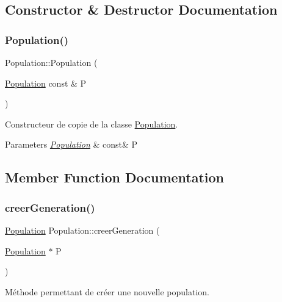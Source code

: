 \subsection{Constructor \& Destructor Documentation}
\mbox{\label{class_population_afb8bfdf1315ba757c6e616e3dcb7c0bb}} 
\subsubsection{\texorpdfstring{Population()}{Population()}}
{\footnotesize\ttfamily Population\+::\+Population (\begin{DoxyParamCaption}\item[{\hyperlink{class_population}{Population} const \&}]{P }\end{DoxyParamCaption})}



Constructeur de copie de la classe \hyperlink{class_population}{Population}. 


\begin{DoxyParams}{Parameters}
{\em \hyperlink{class_population}{Population}} & const\& P \\
\hline
\end{DoxyParams}


\subsection{Member Function Documentation}
\mbox{\label{class_population_af3c4abb60e3dcd0eb183014a9d21419c}} 
\subsubsection{\texorpdfstring{creer\+Generation()}{creerGeneration()}}
{\footnotesize\ttfamily \hyperlink{class_population}{Population} Population\+::creer\+Generation (\begin{DoxyParamCaption}\item[{\hyperlink{class_population}{Population} $\ast$}]{P }\end{DoxyParamCaption})}



Méthode permettant de créer une nouvelle population. 


